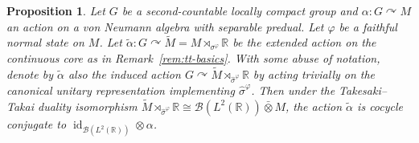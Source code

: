 \documentclass[11pt,a4paper]{article}
\newtheorem{prop}[theorem]{Proposition}
\theoremstyle{definition}
\theoremstyle{remark}
\numberwithin{equation}{section}
\numberwithin{theorem}{section}
\renewcommand{\tilde}{\widetilde}
\newcommand{\acts}{\curvearrowright}
\begin{document}
\begin{prop} \label{prop:Takai-duality}
Let $G$ be a second-countable locally compact group and $\alpha: G \acts M$ an action on a von Neumann algebra with separable predual.
Let $\varphi$ be a faithful normal state on $M$.
Let $\tilde{\alpha}: G\curvearrowright\tilde{M}=M\rtimes_{\sigma^\varphi}\mathbb R$ be the extended action on the continuous core as in Remark~\ref{rem:tt-basics}.
With some abuse of notation, denote by $\tilde{\alpha}$ also the induced action $G\curvearrowright\tilde{M}\rtimes_{\hat{\sigma}^\varphi}\mathbb R$ by acting trivially on the canonical unitary representation implementing $\hat{\sigma}^\varphi$.
Then under the Takesaki--Takai duality isomorphism $\tilde{M}\rtimes_{\hat{\sigma}^\varphi}\mathbb R \cong \mathcal B(L^2(\mathbb R))\bar{\otimes} M$, the action $\tilde{\alpha}$ is cocycle conjugate to $\operatorname{id}_{\mathcal{B}(L^2(\mathbb R))}\otimes\alpha$.
\end{prop}
\end{document}
